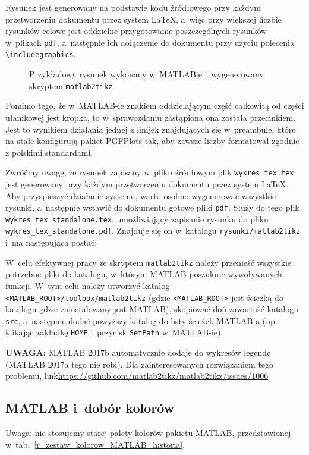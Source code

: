 Rysunek jest generowany na podstawie kodu źródłowego przy każdym przetworzeniu dokumentu przez system \LaTeX, a~więc przy większej liczbie rysunków celowe jest oddzielne przygotowanie poszczególnych rysunków w~plikach \verb+pdf+, a~następnie ich dołączenie do dokumentu przy użyciu polecenia \verb+\includegraphics+.

\begin{figure}[H]
\centering
	
\caption{Przykładowy rysunek wykonany w~MATLABie i~wygenerowany skryptem \texttt{matlab2tikz}}
\label{r_matlab2tikz}
\end{figure}

Pomimo tego, że w~MATLAB-ie znakiem oddzielającym część całkowitą od części ułamkowej jest kropka, to w~sprawozdaniu zastąpiona ona została przecinkiem. Jest to wynikiem działania jednej z linijek znajdujących się w~preambule, które na stałe konfigurują pakiet PGFPlots tak, aby zawsze liczby formatował zgodnie z polskimi standardami.

Zwróćmy uwagę, że rysunek zapisany w~pliku źródłowym plik \verb+wykres_tex.tex+ jest generowany przy każdym przetworzeniu dokumentu przez system \LaTeX. Aby przyspieszyć działanie systemu, warto osobno wygenerować wszystkie rysunki, a~następnie wstawić do dokumentu gotowe pliki \verb+pdf+. Służy do tego plik \verb+wykres_tex_standalone.tex+, umożliwiający zapisanie rysunku do pliku \verb+wykres_tex_standalone.pdf+. Znajduje się on w~katalogu \verb+rysunki/matlab2tikz+ i~ma następującą postać:


W~celu efektywnej pracy ze skryptem \texttt{matlab2tikz} należy przenieść wszystkie potrzebne pliki do katalogu, w~którym MATLAB poszukuje wywoływanych funkcji. W~tym celu należy utworzyć katalog \verb|<MATLAB_ROOT>/toolbox/matlab2tikz| (gdzie \verb|<MATLAB_ROOT>| jest ścieżką do katalogu gdzie zainstalowany jest MATLAB), skopiować doń zawartość katalogu \verb|src|, a~następnie dodać powyższy katalog do listy ścieżek MATLAB-a (np. klikając zakładkę \verb|HOME| i~przycisk \verb|SetPath| w~MATLAB-ie).

\textbf{UWAGA:} MATLAB 2017b automatycznie dodaje do wykresów legendę (MATLAB 2017a tego nie robi). Dla zainteresowanych rozwiązaniem tego problemu, link\newline \url{https://github.com/matlab2tikz/matlab2tikz/issues/1006}

\subsection{MATLAB i~dobór kolorów}
Uwaga: nie stosujemy starej palety kolorów pakietu MATLAB, przedstawionej w~tab.~\ref{r_zestaw_kolorow_MATLAB_historia}.

